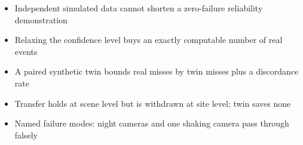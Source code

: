 \begin{itemize}
\item Independent simulated data cannot shorten a zero-failure reliability demonstration
\item Relaxing the confidence level buys an exactly computable number of real events
\item A paired synthetic twin bounds real misses by twin misses plus a discordance rate
\item Transfer holds at scene level but is withdrawn at site level; twin saves none
\item Named failure modes: night cameras and one shaking camera pass through falsely
\end{itemize}
